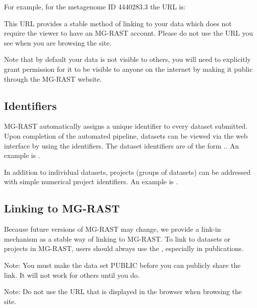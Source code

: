 \documentclass[letterpaper,10pt,english]{sphinxmanual}
\begin{document}


For example, for the metagenome ID 4440283.3 the URL is:


This URL provides a stable method of linking to your data which does not
require the viewer to have an MG-RAST account. Please do not use the URL
you see when you are browsing the site.

Note that by default your data is not visible to others, you will need
to explicitly grant permission for it to be visible to anyone on the
internet by making it public through the MG-RAST website.


\subsection{Identifiers}
\label{\detokenize{faq:section-identifier}}\label{\detokenize{faq:identifiers}}
MG-RAST automatically assigns a unique identifier to every dataset
submitted. Upon completion of the automated pipeline, datasets can be
viewed via the web interface by using the identifiers. The dataset
identifiers are of the form .. An
example is .

In addition to individual datasets, projects (groups of datasets) can be
addressed with simple numerical project identifiers. An example is
.


\subsection{Linking to MG-RAST}
\label{\detokenize{faq:linking-to-mg-rast}}\label{\detokenize{faq:section-linkin}}
Because future versions of MG-RAST may change, we provide a link-in
mechanism as a stable way of linking to MG-RAST. To link to datasets or
projects in MG-RAST, users should always use the ,
especially in publications.

Note: You must make the data set PUBLIC before you can publicly share
the link. It will not work for others until you do.

Note: Do not use the URL that is displayed in the browser when browsing
the site.
\end{document}
